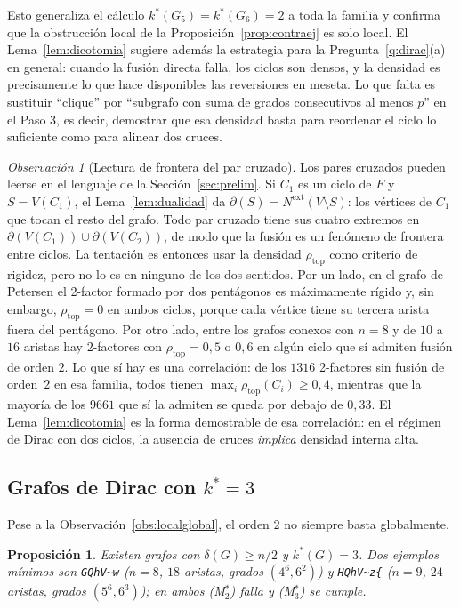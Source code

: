 \documentclass[11pt,a4paper]{article}
\newtheorem{proposicion}[teorema]{Proposición}
\theoremstyle{definition}
\theoremstyle{remark}
\newtheorem{observacion}[teorema]{Observación}
\newcommand{\rtop}{\rho_{\mathrm{top}}}
\newcommand{\Nx}{N^{\mathrm{ext}}}
\begin{document}
Esto generaliza el cálculo $k^*(G_5)=k^*(G_6)=2$ a toda la familia y confirma que la obstrucción local de la Proposición~\ref{prop:contraej} es solo local. El Lema~\ref{lem:dicotomia} sugiere además la estrategia para la Pregunta~\ref{q:dirac}(a) en general: cuando la fusión directa falla, los ciclos son densos, y la densidad es precisamente lo que hace disponibles las reversiones en meseta. Lo que falta es sustituir ``clique'' por ``subgrafo con suma de grados consecutivos al menos $p$'' en el Paso 3, es decir, demostrar que esa densidad basta para reordenar el ciclo lo suficiente como para alinear dos cruces.


\begin{observacion}[Lectura de frontera del par cruzado]\label{obs:frontera2f}
Los pares cruzados pueden leerse en el lenguaje de la Sección~\ref{sec:prelim}. Si $C_1$ es un ciclo de $F$ y $S=V(C_1)$, el Lema~\ref{lem:dualidad} da $\partial(S)=\Nx(V\setminus S)$: los vértices de $C_1$ que tocan el resto del grafo. Todo par cruzado tiene sus cuatro extremos en $\partial(V(C_1))\cup\partial(V(C_2))$, de modo que la fusión es un fenómeno de frontera entre ciclos. La tentación es entonces usar la densidad $\rtop$ como criterio de rigidez, pero no lo es en ninguno de los dos sentidos. Por un lado, en el grafo de Petersen el 2-factor formado por dos pentágonos es máximamente rígido y, sin embargo, $\rtop=0$ en ambos ciclos, porque cada vértice tiene su tercera arista fuera del pentágono. Por otro lado, entre los grafos conexos con $n=8$ y de $10$ a $16$ aristas hay $2$-factores con $\rtop=0{,}5$ o $0{,}6$ en algún ciclo que sí admiten fusión de orden $2$. Lo que sí hay es una correlación: de los $1316$ 2-factores sin fusión de orden~$2$ en esa familia, todos tienen $\max_i\rtop(C_i)\ge0{,}4$, mientras que la mayoría de los $9661$ que sí la admiten se queda por debajo de $0{,}33$. El Lema~\ref{lem:dicotomia} es la forma demostrable de esa correlación: en el régimen de Dirac con dos ciclos, la ausencia de cruces \emph{implica} densidad interna alta.
\end{observacion}

\subsection{Grafos de Dirac con $k^*=3$}

Pese a la Observación~\ref{obs:localglobal}, el orden $2$ no siempre basta globalmente.

\begin{proposicion}\label{prop:dirac3}
Existen grafos con $\delta(G)\ge n/2$ y $k^*(G)=3$. Dos ejemplos mínimos son \verb|GQhV~w| ($n=8$, $18$ aristas, grados $(4^6,6^2)$) y \verb|HQhV~z{| ($n=9$, $24$ aristas, grados $(5^6,6^3)$); en ambos (M$^*_2$) falla y (M$^*_3$) se cumple.
\end{proposicion}
\end{document}
